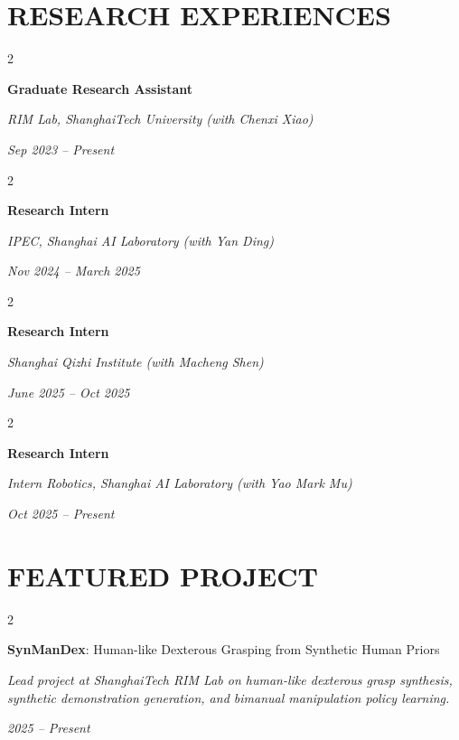 \documentclass[10pt, letterpaper]{article}
\newcommand{\SynManDexName}{\textcolor{synblue}{\textbf{Syn}}\textcolor{manorange}{\textbf{Man}}\textcolor{dexteal}{\textbf{Dex}}}
\newenvironment{twocolentry}[2][]{
    \onecolentry
    \def\secondColumn{#2}
    \setcolumnwidth{\fill, 4.5 cm}
    \begin{paracol}{2}
}{
    \switchcolumn \raggedleft \secondColumn
    \end{paracol}
    \endonecolentry
} %
\begin{document}
\section{RESEARCH EXPERIENCES}

    \begin{twocolentry}{
    \textit{}    
        
    \textit{Sep 2023 – Present}}
        \textbf{Graduate Research Assistant}
        
        \textit{RIM Lab, ShanghaiTech University \hfill (with Chenxi Xiao)}
    \end{twocolentry}

    \vspace{0.08 cm}

    \begin{twocolentry}{
    \textit{}    
        
    \textit{Nov 2024 – March 2025}}
        \textbf{Research Intern}
        
        \textit{IPEC, Shanghai AI Laboratory \hfill (with Yan Ding)}
    \end{twocolentry}

    \vspace{0.08 cm}

    \begin{twocolentry}{
    \textit{}

    \textit{June 2025 – Oct 2025}}
        \textbf{Research Intern}
        
        \textit{Shanghai Qizhi Institute \hfill (with Macheng Shen)}
    \end{twocolentry}

    \vspace{0.08 cm}

    \begin{twocolentry}{
    \textit{}

    \textit{Oct 2025 – Present}}
        \textbf{Research Intern}
        
        \textit{Intern Robotics, Shanghai AI Laboratory \hfill (with Yao Mark Mu)}
    \end{twocolentry}


\newpage



\section{FEATURED PROJECT}

\begin{twocolentry}{
\textit{}    
    
\textit{2025 – Present}}
\textbf{\SynManDexName}: Human-like Dexterous Grasping from Synthetic Human Priors
    
    \textit{Lead project at ShanghaiTech RIM Lab on human-like dexterous grasp synthesis, synthetic demonstration generation, and bimanual manipulation policy learning.}

    \textit{ }
\end{twocolentry}
\end{document}
